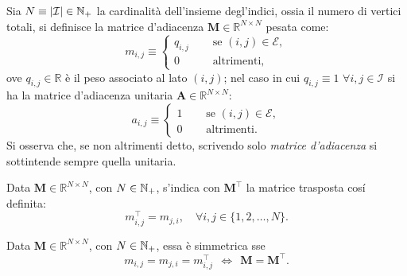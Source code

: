     \begin{dfn}
      \label{defMatriceAdiacenzaUnitariaPesata}
      \newcommand\hspz{\hspace{1em}}
      Sia \(N\equiv\vert\mathcal I\vert\in\mathbb N_+\) la cardinalità dell'insieme degl'indici\footnotemark{}, ossia il numero di vertici totali, si definisce la matrice d'adiacenza \(\mathbf M\in\mathbb R^{N\times N}\) pesata come:%
      \begin{equation}
        \label{eqMatriceAdiacenzaPesata}
        m_{i,j}\equiv
        \left\{\begin{aligned}
          q_{i,j}&\hspz\text{ se }(i,j)\in\mathcal E,\\
          0&\hspz\text{ altrimenti},
        \end{aligned}\right.
      \end{equation}
      ove \(q_{i,j}\in\mathbb R\) è il peso associato al lato \((i,j)\); nel caso in cui \(q_{i,j}\equiv1\) \(\forall i,j\in\mathcal I\) si ha la matrice d'adiacenza unitaria \(\mathbf A\in\mathbb R^{N\times N}\):
      \begin{equation}
        \label{eqMatriceAdiacenzaUnitaria}
        a_{i,j}\equiv
        \left\{\begin{aligned}
          1&\hspz\text{ se }(i,j)\in\mathcal E,\\
          0&\hspz\text{ altrimenti}.
        \end{aligned}\right.
      \end{equation}
      Si osserva che, se non altrimenti detto, scrivendo solo \textit{matrice d'adiacenza} si sottintende sempre quella unitaria.
    \end{dfn}

    \begin{dfn}
      Data \(\mathbf M\in\mathbb R^{N\times N}\), con \(N\in\mathbb N_+\), s'indica con \(\mathbf M^\top\) la matrice trasposta cosí definita:
      \begin{equation*}
        m^\top_{i,j}=m_{j,i},\quad\forall i,j\in\{1,2,\ldots,N\}.
      \end{equation*}
    \end{dfn}

    \begin{dfn}
      Data \(\mathbf M\in\mathbb R^{N\times N}\), con \(N\in\mathbb N_+\), essa è simmetrica sse
      \begin{equation}
        \label{eqMatriceAdiacenzaSimmetrica}
        m_{i,j}=m_{j,i}=m^\top_{i,j}
        \ \ \iff\ \ 
        \mathbf M=\mathbf M^\top.
      \end{equation}
    \end{dfn}

